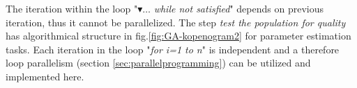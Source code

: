 The iteration within the loop "$\blacktriangledown \ldots$ \emph{while not satisfied}" depends on previous iteration, thus it cannot be parallelized.
The step \emph{test the population for quality} has algorithmical structure in fig.\ref{fig:GA-kopenogram2} for parameter estimation tasks. Each iteration in the loop "\emph{for i=1 to n}" is independent and a therefore loop parallelism (section \ref{sec:parallelprogramming}) can be utilized and implemented here.



